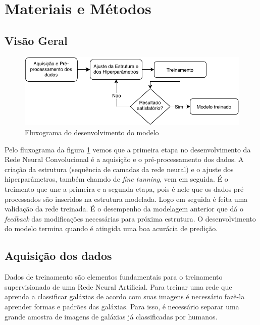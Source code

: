 \section*{Materiais e Métodos}

\subsection*{Visão Geral}

\begin{figure}[h!]
  \centering
  \includegraphics[width=\textwidth]{figures/dl_diagram.pdf}
  \caption{Fluxograma do desenvolvimento do modelo}
  \label{fig:fluxogram}
\end{figure}

Pelo fluxograma da figura \ref{fig:fluxogram} vemos que a primeira etapa no desenvolvimento da Rede Neural Convolucional é a aquisição e o pré-processamento dos dados. A criação da estrutura (sequência de camadas da rede neural) e o ajuste dos hiperparâmetros, também chamdo de \emph{fine tunning}, vem em seguida. É o treimento que une a primeira e a segunda etapa, pois é nele que os dados pré-processados são inseridos na estrutura modelada. Logo em seguida é feita uma validação da rede treinada. É o desempenho da modelagem anterior que dá o \emph{feedback} das modificações necessárias para próxima estrutura. O desenvolvimento do modelo termina quando é atingida uma boa acurácia de predição.

\subsection*{Aquisição dos dados}

Dados de treinamento são elementos fundamentais para o treinamento supervisionado de uma Rede Neural Artificial. Para treinar uma rede que aprenda a classificar galáxias de acordo com suas imagens é necessário fazê-la aprender formas e padrões das galáxias. Para isso, é necessário separar uma grande amostra de imagens de galáxias já classificadas por humanos.

